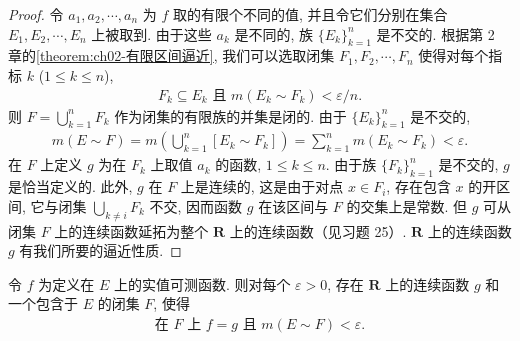 \documentclass[../../main.tex]{subfiles}
\begin{document}
\begin{proof}
令 $a_{1},a_{2},\cdots,a_{n}$ 为 $f$ 取的有限个不同的值, 并且令它们分别在集合 $E_{1},E_{2},\cdots,E_{n}$ 上被取到. 由于这些 $a_{k}$ 是不同的, 族 $\{E_{k}\}_{k=1}^{n}$ 是不交的. 根据第 2 章的\cref{theorem:ch02-有限区间逼近}, 我们可以选取闭集 $F_{1},F_{2},\cdots,F_{n}$ 使得对每个指标 $k$ ($1\leqslant k\leqslant n$),
\begin{align*}
F_{k}\subseteq E_{k}\text{ 且 }m(E_{k}\sim F_{k})<\varepsilon/n.
\end{align*}
则 $F=\bigcup_{k=1}^{n}F_{k}$ 作为闭集的有限族的并集是闭的. 由于 $\{E_{k}\}_{k=1}^{n}$ 是不交的,
\begin{align*}
m(E\sim F)=m\left(\bigcup_{k=1}^{n}[E_{k}\sim F_{k}]\right)=\sum_{k=1}^{n}m(E_{k}\sim F_{k})<\varepsilon.
\end{align*}
在 $F$ 上定义 $g$ 为在 $F_{k}$ 上取值 $a_{k}$ 的函数, $1\leqslant k\leqslant n$. 由于族 $\{F_{k}\}_{k=1}^{n}$ 是不交的, $g$ 是恰当定义的. 此外, $g$ 在 $F$ 上是连续的, 这是由于对点 $x\in F_{i}$, 存在包含 $x$ 的开区间, 它与闭集 $\bigcup_{k\neq i}F_{k}$ 不交, 因而函数 $g$ 在该区间与 $F$ 的交集上是常数. 但 $g$ 可从闭集 $F$ 上的连续函数延拓为整个 $\mathbf{R}$ 上的连续函数（见习题 25）. $\mathbf{R}$ 上的连续函数 $g$ 有我们所要的逼近性质.
\end{proof}

\begin{theorem}[Lusin 定理]\label{theorem:ch03-lusin}
令 $f$ 为定义在 $E$ 上的实值可测函数. 则对每个 $\varepsilon>0$, 存在 $\mathbf{R}$ 上的连续函数 $g$ 和一个包含于 $E$ 的闭集 $F$, 使得
\begin{align*}
\text{在 }F\text{ 上 }f=g\text{ 且 }m(E\sim F)<\varepsilon.
\end{align*}
\end{theorem}
\end{document}
